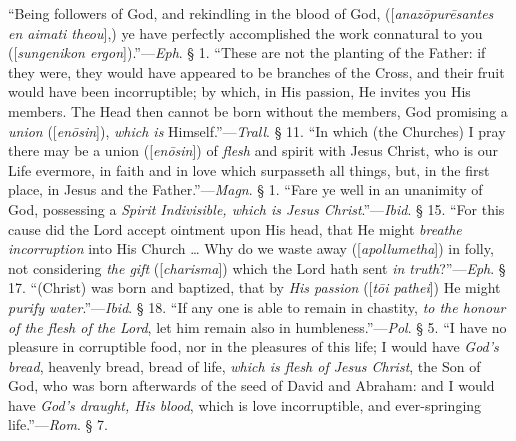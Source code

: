 ``Being
followers of God, and rekindling in the blood of God, ([\emph{anaz\={o}pur\={e}santes
en aimati theou}],) ye have perfectly accomplished the work
connatural to you ([\emph{sungenikon ergon}]).''—\emph{Eph}. § 1. ``These
are not the planting of the Father: if they were, they would have
appeared to be branches of the Cross, and their fruit would have been
incorruptible; by which, in His passion, He invites you His members.
The Head then cannot be born without the members, God promising a \emph{union}
([\emph{en\={o}sin}]), \emph{which is} Himself.''—\emph{Trall}. §
11. ``In which (the Churches) I pray there may be a union ([\emph{en\={o}sin}])
of \emph{flesh} and spirit with Jesus Christ, who is our Life
evermore, in faith and in love which surpasseth all things, but, in
the first place, in Jesus and the Father.''—\emph{Magn}. § 1. ``Fare
ye well in an unanimity of God, possessing a \emph{Spirit Indivisible,
which is Jesus Christ}.''—\emph{Ibid}. § 15. ``For this cause did
the Lord accept ointment upon His head, that He might \emph{breathe
incorruption} into His Church … Why do we waste away ([\emph{apollumetha}])
in folly, not considering \emph{the gift} ([\emph{charisma}]) which
the Lord hath sent \emph{in truth}?''—\emph{Eph}. § 17. ``(Christ)
was born and baptized, that by \emph{His passion} ([\emph{t\={o}i
pathei}]) He might \emph{purify water}.''—\emph{Ibid}. § 18. ``If
any one is able to remain in chastity, \emph{to the honour of the flesh of
the Lord}, let him remain also in humbleness.''—\emph{Pol}. § 5. ``I
have no pleasure in corruptible food, nor in the pleasures of this
life; I would have \emph{God's bread}, heavenly bread, bread of life, \emph{which
is flesh of Jesus Christ}, the Son of God, who was born afterwards
of the seed of David and Abraham: and I would have \emph{God's draught,
His blood}, which is love incorruptible, and ever-springing life.''—\emph{Rom}.
§ 7.

